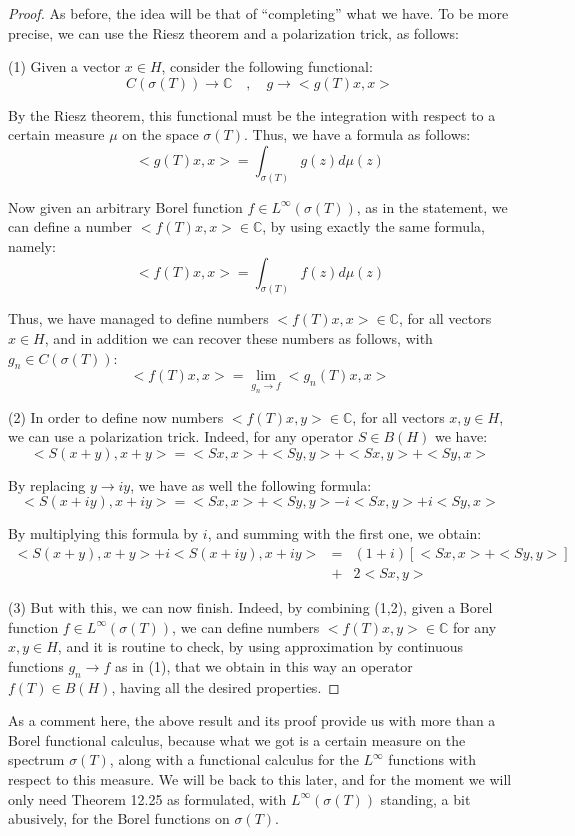 \documentclass[12pt]{amsbook}
\begin{document}
\begin{proof}
As before, the idea will be that of ``completing'' what we have. To be more precise, we can use the Riesz theorem and a polarization trick, as follows:

\medskip

(1) Given a vector $x\in H$, consider the following functional:
$$C(\sigma(T))\to\mathbb C\quad,\quad 
g\to<g(T)x,x>$$

By the Riesz theorem, this functional must be the integration with respect to a certain measure $\mu$ on the space $\sigma(T)$. Thus, we have a formula as follows:
$$<g(T)x,x>=\int_{\sigma(T)}g(z)d\mu(z)$$

Now given an arbitrary Borel function $f\in L^\infty(\sigma(T))$, as in the statement, we can define a number $<f(T)x,x>\in\mathbb C$, by using exactly the same formula, namely:
$$<f(T)x,x>=\int_{\sigma(T)}f(z)d\mu(z)$$

Thus, we have managed to define numbers $<f(T)x,x>\in\mathbb C$, for all vectors $x\in H$, and in addition we can recover these numbers as follows, with $g_n\in C(\sigma(T))$:
$$<f(T)x,x>=\lim_{g_n\to f}<g_n(T)x,x>$$ 

(2) In order to define now numbers $<f(T)x,y>\in\mathbb C$, for all vectors $x,y\in H$, we can use a polarization trick. Indeed, for any operator $S\in B(H)$ we have:
$$<S(x+y),x+y>=<Sx,x>+<Sy,y>+<Sx,y>+<Sy,x>$$

By replacing $y\to iy$, we have as well the following formula:
$$<S(x+iy),x+iy>=<Sx,x>+<Sy,y>-i<Sx,y>+i<Sy,x>$$

By multiplying this formula by $i$, and summing with the first one, we obtain:
\begin{eqnarray*}
<S(x+y),x+y>+i<S(x+iy),x+iy>
&=&(1+i)[<Sx,x>+<Sy,y>]\\
&+&2<Sx,y>
\end{eqnarray*}

(3) But with this, we can now finish. Indeed, by combining (1,2), given a Borel function $f\in L^\infty(\sigma(T))$, we can define numbers $<f(T)x,y>\in\mathbb C$ for any $x,y\in H$, and it is routine to check, by using approximation by continuous functions $g_n\to f$ as in (1), that we obtain in this way an operator $f(T)\in B(H)$, having all the desired properties.
\end{proof}

As a comment here, the above result and its proof provide us with more than a Borel functional calculus, because what we got is a certain measure on the spectrum $\sigma(T)$, along with a functional calculus for the $L^\infty$ functions with respect to this measure. We will be back to this later, and for the moment we will only need Theorem 12.25 as formulated, with $L^\infty(\sigma(T))$ standing, a bit abusively, for the Borel functions on $\sigma(T)$.
\end{document}
